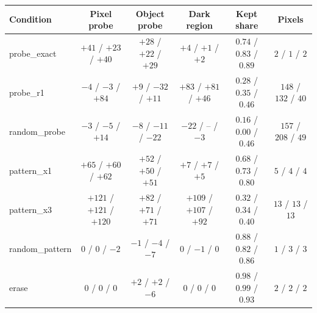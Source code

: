 \begin{tabular}{lccccc}
\toprule
Condition & Pixel probe & Object probe & Dark region & Kept share & Pixels \\
\midrule
probe\_exact & $+41$ / $+23$ / $+40$ & $+28$ / $+22$ / $+29$ & $+4$ / $+1$ / $+2$ & $0.74$ / $0.83$ / $0.89$ & $2$ / $1$ / $2$ \\
probe\_r1 & $-4$ / $-3$ / $+84$ & $+9$ / $-32$ / $+11$ & $+83$ / $+81$ / $+46$ & $0.28$ / $0.35$ / $0.46$ & $148$ / $132$ / $40$ \\
random\_probe & $-3$ / $-5$ / $+14$ & $-8$ / $-11$ / $-22$ & $-22$ / -- / $-3$ & $0.16$ / $0.00$ / $0.46$ & $157$ / $208$ / $49$ \\
pattern\_x1 & $+65$ / $+60$ / $+62$ & $+52$ / $+50$ / $+51$ & $+7$ / $+7$ / $+5$ & $0.68$ / $0.73$ / $0.80$ & $5$ / $4$ / $4$ \\
pattern\_x3 & $+121$ / $+121$ / $+120$ & $+82$ / $+71$ / $+71$ & $+109$ / $+107$ / $+92$ & $0.32$ / $0.34$ / $0.40$ & $13$ / $13$ / $13$ \\
random\_pattern & $0$ / $0$ / $-2$ & $-1$ / $-4$ / $-7$ & $0$ / $-1$ / $0$ & $0.88$ / $0.82$ / $0.86$ & $1$ / $3$ / $3$ \\
erase & $0$ / $0$ / $0$ & $+2$ / $+2$ / $-6$ & $0$ / $0$ / $0$ & $0.98$ / $0.99$ / $0.93$ & $2$ / $2$ / $2$ \\
\bottomrule
\end{tabular}
